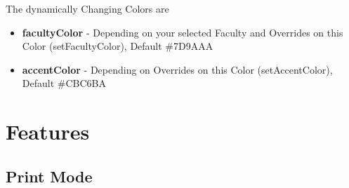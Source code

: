 \documentclass[a4paper]{../uulm-document}
\begin{document}
The dynamically Changing Colors are
\begin{itemize}
\item \textbf{facultyColor} - Depending on your selected Faculty and Overrides on this Color (setFacultyColor), Default \#7D9AAA
\item \textbf{accentColor} - Depending on Overrides on this Color (setAccentColor), Default \#CBC6BA
\end{itemize}

\section{Features}

\subsection{Print Mode}
\end{document}
